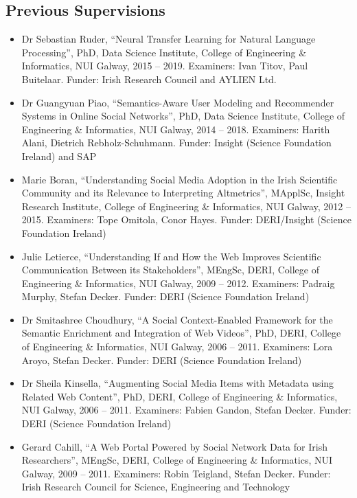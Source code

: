 \documentclass[10pt,a4paper]{res} %
\begin{document}
\begin{resume}
\subsection*{Previous Supervisions}

\begin{itemize} \itemsep -2pt
\item Dr Sebastian Ruder, ``Neural Transfer Learning for Natural Language Processing'', PhD, Data Science Institute, College of Engineering \& Informatics, NUI Galway, 2015 -- 2019. Examiners: Ivan Titov, Paul Buitelaar. Funder: Irish Research Council and AYLIEN Ltd. %
\item Dr Guangyuan Piao, ``Semantics-Aware User Modeling and Recommender Systems in Online Social Networks'', PhD, Data Science Institute, College of Engineering \& Informatics, NUI Galway, 2014 -- 2018. Examiners: Harith Alani, Dietrich Rebholz-Schuhmann. Funder: Insight (Science Foundation Ireland) and SAP %
\item Marie Boran, ``Understanding Social Media Adoption in the Irish Scientific Community and its Relevance to Interpreting Altmetrics'', MApplSc, Insight Research Institute, College of Engineering \& Informatics, NUI Galway, 2012 -- 2015. Examiners: Tope Omitola, Conor Hayes. Funder: DERI/Insight (Science Foundation Ireland)
\item Julie Letierce, ``Understanding If and How the Web Improves Scientific Communication Between its Stakeholders'', MEngSc, DERI, College of Engineering \& Informatics, NUI Galway, 2009 -- 2012. Examiners: Padraig Murphy, Stefan Decker. Funder: DERI (Science Foundation Ireland)
\item Dr Smitashree Choudhury, ``A Social Context-Enabled Framework for the Semantic Enrichment and Integration of Web Videos'', PhD, DERI, College of Engineering \& Informatics, NUI Galway, 2006 -- 2011. Examiners: Lora Aroyo, Stefan Decker. Funder: DERI (Science Foundation Ireland) %
\item Dr Sheila Kinsella, ``Augmenting Social Media Items with Metadata using Related Web Content'', PhD, DERI, College of Engineering \& Informatics, NUI Galway, 2006 -- 2011. Examiners: Fabien Gandon, Stefan Decker. Funder: DERI (Science Foundation Ireland) %
\item Gerard Cahill, ``A Web Portal Powered by Social Network Data for Irish Researchers'', MEngSc, DERI, College of Engineering \& Informatics, NUI Galway, 2009 -- 2011. Examiners: Robin Teigland, Stefan Decker. Funder: Irish Research Council for Science, Engineering and Technology

\end{itemize}
\end{resume}
\end{document}
